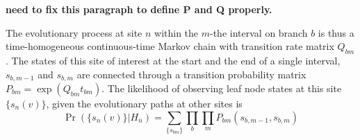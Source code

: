 \documentclass[11pt]{article}
\begin{document}
{\bf need to fix this paragraph to define P and Q properly.}

The evolutionary process at site $n$ within the $m$-the interval on
branch $b$ is thus a time-homogeneous continuous-time Markov chain
with transition rate matrix $Q_{bm}$.  The states of this site of
interest at the start and the end of a single interval, $s_{b,m-1}$
and $s_{b,m}$ are connected through a transition probability matrix
$P_{bm} = \exp(Q_{bm}t_{bm})$.  The likelihood of observing leaf node
states at this site $\{s_n(v)\}$, given the evolutionary paths at
other sites is
\[
\Pr(\{s_n(v)\} | H_{\overline{n}}) = \sum_{\{s_{bm}\}} \prod_{b} \prod_{m} P_{bm}(s_{b,m-1}, s_{b, m})
\]

\end{document}
